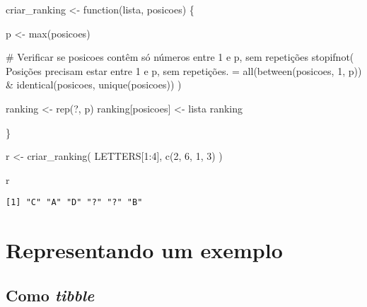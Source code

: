 \documentclass[
  letterpaper,
  DIV=11,
  numbers=noendperiod]{scrreprt}
\newenvironment{Shaded}{\begin{snugshade}}{\end{snugshade}}
\newcommand{\CommentTok}[1]{\textcolor[rgb]{0.37,0.37,0.37}{#1}}
\newcommand{\ControlFlowTok}[1]{\textcolor[rgb]{0.00,0.23,0.31}{#1}}
\newcommand{\DecValTok}[1]{\textcolor[rgb]{0.68,0.00,0.00}{#1}}
\newcommand{\FunctionTok}[1]{\textcolor[rgb]{0.28,0.35,0.67}{#1}}
\newcommand{\NormalTok}[1]{\textcolor[rgb]{0.00,0.23,0.31}{#1}}
\newcommand{\OtherTok}[1]{\textcolor[rgb]{0.00,0.23,0.31}{#1}}
\newcommand{\SpecialCharTok}[1]{\textcolor[rgb]{0.37,0.37,0.37}{#1}}
\newcommand{\StringTok}[1]{\textcolor[rgb]{0.13,0.47,0.30}{#1}}
\begin{document}
\begin{Shaded}
\begin{Highlighting}[]
\NormalTok{criar\_ranking }\OtherTok{\textless{}{-}} \ControlFlowTok{function}\NormalTok{(lista, posicoes) \{}
  
\NormalTok{  p }\OtherTok{\textless{}{-}} \FunctionTok{max}\NormalTok{(posicoes)}
  
  \CommentTok{\# Verificar se posicoes contêm só números entre 1 e p, sem repetições}
  \FunctionTok{stopifnot}\NormalTok{(}
    \StringTok{\textquotesingle{}Posições precisam estar entre 1 e p, sem repetições.\textquotesingle{}} \OtherTok{=}
    \FunctionTok{all}\NormalTok{(}\FunctionTok{between}\NormalTok{(posicoes, }\DecValTok{1}\NormalTok{, p)) }\SpecialCharTok{\&} \FunctionTok{identical}\NormalTok{(posicoes, }\FunctionTok{unique}\NormalTok{(posicoes))}
\NormalTok{  )}
  
\NormalTok{  ranking }\OtherTok{\textless{}{-}} \FunctionTok{rep}\NormalTok{(}\StringTok{\textquotesingle{}?\textquotesingle{}}\NormalTok{, p)}
\NormalTok{  ranking[posicoes] }\OtherTok{\textless{}{-}}\NormalTok{ lista}
\NormalTok{  ranking}
  
\NormalTok{\}}
\end{Highlighting}
\end{Shaded}

\begin{Shaded}
\begin{Highlighting}[]
\NormalTok{r }\OtherTok{\textless{}{-}} \FunctionTok{criar\_ranking}\NormalTok{(}
\NormalTok{  LETTERS[}\DecValTok{1}\SpecialCharTok{:}\DecValTok{4}\NormalTok{],}
  \FunctionTok{c}\NormalTok{(}\DecValTok{2}\NormalTok{, }\DecValTok{6}\NormalTok{, }\DecValTok{1}\NormalTok{, }\DecValTok{3}\NormalTok{)}
\NormalTok{)}

\NormalTok{r}
\end{Highlighting}
\end{Shaded}

\begin{verbatim}
[1] "C" "A" "D" "?" "?" "B"
\end{verbatim}

\section{Representando um exemplo}\label{representando-um-exemplo}

\subsection{\texorpdfstring{Como
\emph{tibble}}{Como tibble}}\label{como-tibble}
\end{document}
